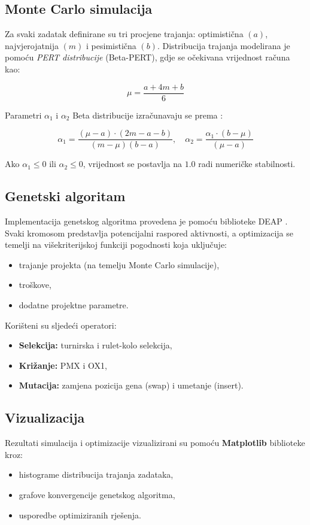 \subsection{Monte Carlo simulacija}

Za svaki zadatak definirane su tri procjene trajanja: optimistična $(a)$, najvjerojatnija $(m)$ i pesimistična $(b)$.  
Distribucija trajanja modelirana je pomoću \textit{PERT distribucije} (Beta-PERT), gdje se očekivana vrijednost računa kao:

\[
\mu = \frac{a + 4m + b}{6}
\]

Parametri $\alpha_1$ i $\alpha_2$ Beta distribucije izračunavaju se prema \cite{Vose2008}:

\[
\alpha_1 = \frac{(\mu - a) \cdot (2m - a - b)}{(m - \mu)(b - a)}, \quad
\alpha_2 = \frac{\alpha_1 \cdot (b - \mu)}{(\mu - a)}
\]

Ako $\alpha_1 \leq 0$ ili $\alpha_2 \leq 0$, vrijednost se postavlja na $1.0$ radi numeričke stabilnosti.

\subsection{Genetski algoritam}

Implementacija genetskog algoritma provedena je pomoću biblioteke DEAP \cite{DEAP2012}.  
Svaki kromosom predstavlja potencijalni raspored aktivnosti, a optimizacija se temelji na višekriterijskoj funkciji pogodnosti koja uključuje:
\begin{itemize}
    \item trajanje projekta (na temelju Monte Carlo simulacije),
    \item troškove,
    \item dodatne projektne parametre.
\end{itemize}

Korišteni su sljedeći operatori:
\begin{itemize}
    \item \textbf{Selekcija:} turnirska i rulet-kolo selekcija,
    \item \textbf{Križanje:} PMX i OX1,
    \item \textbf{Mutacija:} zamjena pozicija gena (swap) i umetanje (insert).
\end{itemize}

\subsection{Vizualizacija}

Rezultati simulacija i optimizacije vizualizirani su pomoću \textbf{Matplotlib} \cite{Hunter2007} biblioteke kroz:
\begin{itemize}
    \item histograme distribucija trajanja zadataka,
    \item grafove konvergencije genetskog algoritma,
    \item usporedbe optimiziranih rješenja.
\end{itemize}


